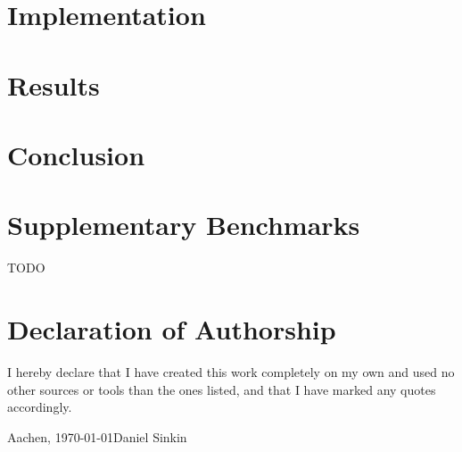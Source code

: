 \documentclass[
  a4paper,
  12pt,
  twoside,
  open=any,
  bibliography=totoc,
  listof=totoc
]{scrreprt}
\begin{document}
\chapter{Implementation}\label{ch:implementation}


\chapter{Results}\label{ch:results}


\chapter{Conclusion}\label{ch:conclusion}



\nocite{*}


\appendix


\chapter{Supplementary Benchmarks}\label{app:benchmarks}
TODO





\clearpage
\chapter*{Declaration of Authorship}
I hereby declare that I have created this work completely on my own and used
no other sources or tools than the ones listed, and that I have marked any
quotes accordingly.

\vspace{2cm}
\noindent
Aachen, \today \hfill Daniel Sinkin
\end{document}
